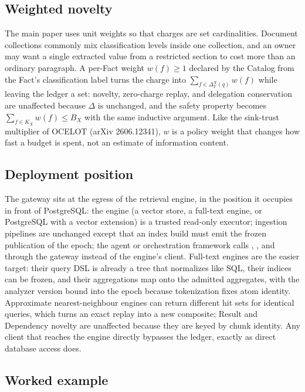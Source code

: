 \documentclass[journal,onecolumn]{IEEEtran}
\newcommand{\code}[1]{\texttt{\detokenize{#1}}}
\begin{document}
\subsection{Weighted novelty}

The main paper uses unit weights so that charges are set cardinalities.
Document collections commonly mix classification levels inside one
collection, and an owner may want a single extracted value from a restricted
section to cost more than an ordinary paragraph. A per-Fact weight
$w(f)\ge 1$ declared by the Catalog from the Fact's classification label
turns the charge into $\sum_{f\in\Delta_T^X(q)} w(f)$ while leaving the
ledger a set: novelty, zero-charge replay, and delegation conservation are
unaffected because $\Delta$ is unchanged, and the safety property becomes
$\sum_{f\in K_X} w(f)\le B_X$ with the same inductive argument. Like the
sink-trust multiplier of OCELOT (arXiv 2606.12341), $w$ is a policy weight that changes how fast
a budget is spent, not an estimate of information content.

\subsection{Deployment position}

The gateway sits at the egress of the retrieval engine, in the position it
occupies in front of PostgreSQL: the engine (a vector store, a full-text
engine, or PostgreSQL with a vector extension) is a trusted read-only
executor; ingestion pipelines are unchanged except that an index build must
emit the frozen publication of the epoch; the agent or orchestration
framework calls \code{search}, \code{fetch}, and \code{aggregate} through
the gateway instead of the engine's client. Full-text engines are the
easier target: their query DSL is already a tree that normalizes like SQL,
their indices can be frozen, and their aggregations map onto the admitted
aggregates, with the analyzer version bound into the epoch because
tokenization fixes atom identity. Approximate nearest-neighbour engines
can return different hit sets for identical queries, which turns an exact
replay into a new composite; Result and Dependency novelty are unaffected
because they are keyed by chunk identity. Any client that reaches the
engine directly bypasses the ledger, exactly as direct database access does.

\subsection{Worked example}
\end{document}
